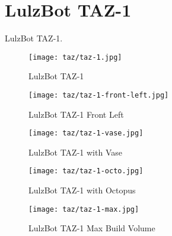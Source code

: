 %
%
%
%
%

\section{LulzBot TAZ-1}
LulzBot TAZ-1.

\begin{figure}[h!]
\texttt{[image: taz/taz-1.jpg]}
 \caption{LulzBot TAZ-1}
 \label{fig:taz-1}
\end{figure}

\begin{figure}[h!]
\texttt{[image: taz/taz-1-front-left.jpg]}
 \caption{LulzBot TAZ-1 Front Left}
 \label{fig:taz-1-front-left}
\end{figure}

\begin{figure}[h!]
\texttt{[image: taz/taz-1-vase.jpg]}
 \caption{LulzBot TAZ-1 with Vase}
 \label{fig:taz-1-vase}
\end{figure}

\begin{figure}[h!]
\texttt{[image: taz/taz-1-octo.jpg]}
 \caption{LulzBot TAZ-1 with Octopus}
 \label{fig:taz-1-octo}
\end{figure}

\begin{figure}[h!]
\texttt{[image: taz/taz-1-max.jpg]}
 \caption{LulzBot TAZ-1 Max Build Volume}
 \label{fig:taz-1-max}
\end{figure}
